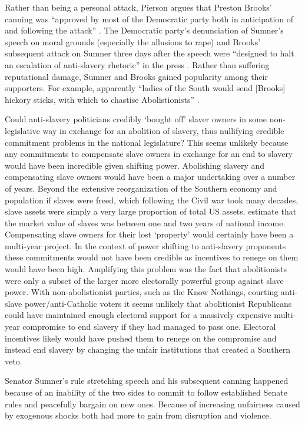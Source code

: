 \documentclass[a4paper]{article}\usepackage[]{graphicx}\usepackage[]{color}
\begin{document}
Rather than being a personal attack, Pierson argues that Preston Brooks' canning was ``approved by most of the Democratic party both in anticipation of and following the attack'' \cite[553]{Pierson1995}. The Democratic party's denunciation of Sumner's speech on moral grounds (especially the allusions to rape) and Brooks' subsequent attack on Sumner three days after the speech were ``designed to halt an escalation of anti-slavery rhetoric'' in the press \cite[553]{Pierson1995}. Rather than suffering reputational damage, Sumner and Brooks gained popularity among their supporters. For example, apparently ``ladies of the South would send [Brooks] hickory sticks, with which to chastise Abolistionists'' \cite[255]{Donald2009}. 

Could anti-slavery politicians credibly `bought off' slaver owners in some non-legislative way in exchange for an abolition of slavery, thus nullifying credible commitment problems in the national legislature? This seems unlikely because any commitments to compensate slave owners in exchange for an end to slavery would have been incredible given shifting power. Abolishing slavery and compensating slave owners would have been a major undertaking over a number of years. Beyond the extensive reorganization of the Southern economy and population if slaves were freed, which following the Civil war took many decades, slave assets were simply a very large proportion of total US assets. \cite{Piketty2013} estimate that the market value of slaves was between one and two years of national income. Compensating slave owners for their lost `property' would certainly have been a multi-year project. In the context of power shifting to anti-slavery proponents these commitments would not have been credible as incentives to renege on them would have been high. Amplifying this problem was the fact that abolitionists were only a subset of the larger more electorally powerful group against slave power. With non-abolistionist parties, such as the Know Nothings, courting anti-slave power/anti-Catholic voters it seems unlikely that abolitionist Republicans could have maintained enough electoral support for a massively expensive multi-year compromise to end slavery if they had managed to pass one. Electoral incentives likely would have pushed them to renege on the compromise and instead end slavery by changing the unfair institutions that created a Southern veto.

Senator Sumner's rule stretching speech and his subsequent canning happened because of an inability of the two sides to commit to follow established Senate rules and peacefully bargain on new ones. Because of increasing unfairness caused by exogenous shocks both had more to gain from disruption and violence. 
\end{document}
